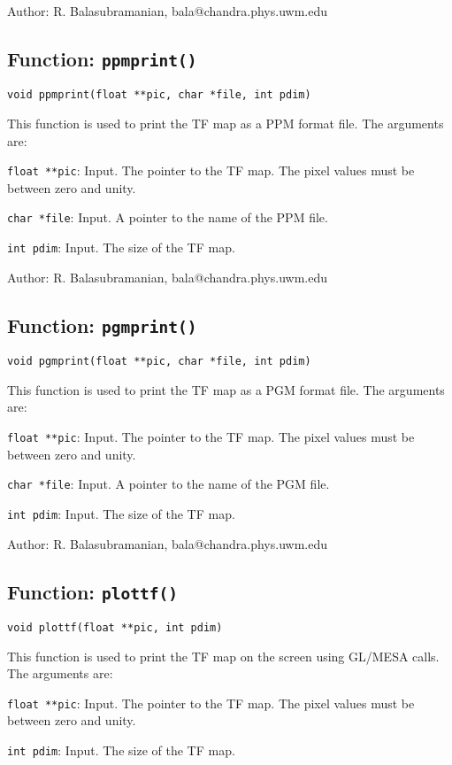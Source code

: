 \noindent Author: R. Balasubramanian, bala@chandra.phys.uwm.edu

\newpage

\subsection{Function: {\tt ppmprint()}}

{\tt void ppmprint(float **pic, char *file, int pdim)}

This function is used to print the TF map as a PPM format file. 
The arguments are:
\begin{description}
\item {\tt float **pic}: Input. The pointer to the TF map. The
pixel values must be between zero and unity.
\item {\tt char *file}: Input. A pointer to the name of the PPM
file. 
\item {\tt int pdim}: Input. The size of the TF map. 
\end{description}

\noindent Author: R. Balasubramanian, bala@chandra.phys.uwm.edu

\subsection{Function: {\tt pgmprint()}}

{\tt void pgmprint(float **pic, char *file, int pdim)}

This function is used to print the TF map as a PGM format file. 
The arguments are:
\begin{description}
\item {\tt float **pic}: Input. The pointer to the TF map. The
pixel values must be between zero and unity.
\item {\tt char *file}: Input. A pointer to the name of the PGM
file. 
\item {\tt int pdim}: Input. The size of the TF map. 
\end{description}

\noindent Author: R. Balasubramanian, bala@chandra.phys.uwm.edu

\subsection{Function: {\tt plottf()}}

{\tt void plottf(float **pic, int pdim)}

This function is used to print the TF map on the screen using GL/MESA calls.
The arguments are:
\begin{description}
\item {\tt float **pic}: Input. The pointer to the TF map. The
pixel values must be between zero and unity.
\item {\tt int pdim}: Input. The size of the TF map. 
\end{description}

